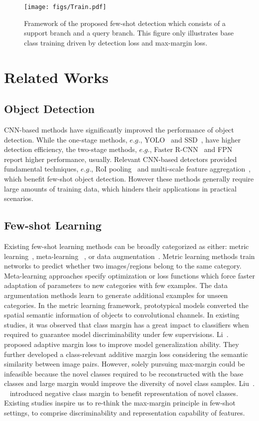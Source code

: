 \documentclass[final]{cvpr}
\begin{document}
\begin{figure*}[t]
\centering
\texttt{[image: figs/Train.pdf]}
\caption{Framework of the proposed few-shot detection which consists of a support branch and a query branch. This figure only illustrates base class training driven by detection loss and max-margin loss.}
\label{fig:flowchart}
\end{figure*}

\section{Related Works}
\subsection{Object Detection}
CNN-based methods have significantly improved the performance of object detection. While the one-stage methods, $e.g.$, YOLO~\cite{YOLO,YOLOV2} and SSD~\cite{SSD}, have higher detection efficiency, the two-stage methods, $e.g.$, Faster R-CNN~\cite{FRCNN,FasterRCNN} and FPN~\cite{FPN} report higher performance, usually. Relevant CNN-based detectors provided fundamental techniques, $e.g.$, RoI pooling~\cite{FRCNN} and multi-scale feature aggregation~\cite{FPN}, which benefit few-shot object detection. However these methods generally require large amounts of training data, which hinders their applications in practical scenarios.

\subsection{Few-shot Learning}
Existing few-shot learning methods can be broadly categorized as either: metric learning~\cite{MatchNetwork16,Compare2018,CollectSelect19,DeepEMD,PMMs,Liu_2021_CVPR,Harmonic,AMN}, meta-learning ~\cite{LearningToLearn16,Optimization17,MAML17,TaskAgnosticMeta19}, or data augmentation~\cite{Hallucinating17,Imaginary18}.
Metric learning methods train networks to predict whether two images/regions belong to the same category. Meta-learning approaches specify optimization or loss functions which force faster adaptation of parameters to new categories with few examples. The data argumentation methods learn to generate additional examples for unseen categories. In the metric learning framework, prototypical models converted the spatial semantic information of objects to convolutional channels. 
In existing studies, it was observed that class margin has a great impact to classifiers when required to guarantee model discriminability under few supervisions. Li~\etal.~\cite{AdaptiveMargin} proposed adaptive margin loss to improve model generalization ability. They further developed a class-relevant additive margin loss considering the semantic similarity between image pairs.
However, solely pursuing max-margin could be infeasible because the novel classes required to be reconstructed with the base classes and large margin would improve the diversity of novel class samples.
Liu~\etal. ~\cite{NegativeMargin} introduced negative class margin to benefit representation of novel classes. Existing studies inspire us to re-think the max-margin principle in few-shot settings, to comprise discriminability and representation capability of features.
\end{document}
